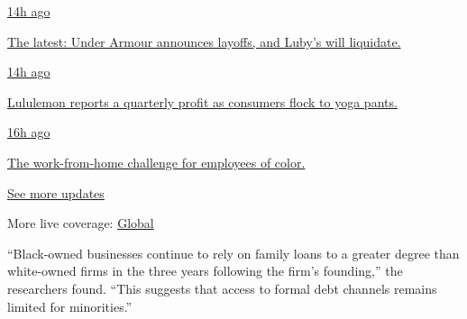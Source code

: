 \href{https://www.nytimes3xbfgragh.onion/live/2020/09/08/business/stock-market-today-coronavirus?action=click\&pgtype=Article\&state=default\&region=MAIN_CONTENT_1\&context=storylines_live_updates\#the-latest-under-armour-announces-layoffs-and-lubys-will-liquidate}{14h
ago}

\href{https://www.nytimes3xbfgragh.onion/live/2020/09/08/business/stock-market-today-coronavirus?action=click\&pgtype=Article\&state=default\&region=MAIN_CONTENT_1\&context=storylines_live_updates\#the-latest-under-armour-announces-layoffs-and-lubys-will-liquidate}{The
latest: Under Armour announces layoffs, and Luby's will liquidate.}

\href{https://www.nytimes3xbfgragh.onion/live/2020/09/08/business/stock-market-today-coronavirus?action=click\&pgtype=Article\&state=default\&region=MAIN_CONTENT_1\&context=storylines_live_updates\#lululemon-reports-a-quarterly-profit-as-consumers-flock-to-yoga-pants}{14h
ago}

\href{https://www.nytimes3xbfgragh.onion/live/2020/09/08/business/stock-market-today-coronavirus?action=click\&pgtype=Article\&state=default\&region=MAIN_CONTENT_1\&context=storylines_live_updates\#lululemon-reports-a-quarterly-profit-as-consumers-flock-to-yoga-pants}{Lululemon
reports a quarterly profit as consumers flock to yoga pants.}

\href{https://www.nytimes3xbfgragh.onion/live/2020/09/08/business/stock-market-today-coronavirus?action=click\&pgtype=Article\&state=default\&region=MAIN_CONTENT_1\&context=storylines_live_updates\#the-work-from-home-challenge-for-employees-of-color}{16h
ago}

\href{https://www.nytimes3xbfgragh.onion/live/2020/09/08/business/stock-market-today-coronavirus?action=click\&pgtype=Article\&state=default\&region=MAIN_CONTENT_1\&context=storylines_live_updates\#the-work-from-home-challenge-for-employees-of-color}{The
work-from-home challenge for employees of color.}

\href{https://www.nytimes3xbfgragh.onion/live/2020/09/08/business/stock-market-today-coronavirus?action=click\&pgtype=Article\&state=default\&region=MAIN_CONTENT_1\&context=storylines_live_updates}{See
more updates}

More live coverage:
\href{https://www.nytimes3xbfgragh.onion/2020/09/09/world/covid-19-coronavirus.html?action=click\&pgtype=Article\&state=default\&region=MAIN_CONTENT_1\&context=storylines_live_updates}{Global}

``Black-owned businesses continue to rely on family loans to a greater
degree than white-owned firms in the three years following the firm's
founding,'' the researchers found. ``This suggests that access to formal
debt channels remains limited for minorities.''

